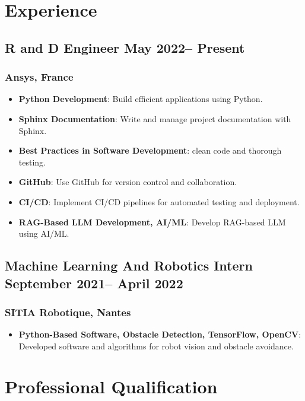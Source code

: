 \documentclass[11pt]{article}
\begin{document}
\section{Experience}
\subsection{R and D Engineer \hfill \normalfont May 2022-- Present}
\subsubsection{Ansys, France}
\begin{itemize}
    \item[\textbullet] \textbf{Python Development}: Build efficient applications using Python.
    \item[\textbullet] \textbf{Sphinx Documentation}: Write and manage project documentation with Sphinx.
    \item[\textbullet] \textbf{Best Practices in Software Development}: clean code and thorough testing.
    \item[\textbullet] \textbf{GitHub}: Use GitHub for version control and collaboration.
    \item[\textbullet] \textbf{CI/CD}: Implement CI/CD pipelines for automated testing and deployment.
    \item[\textbullet] \textbf{RAG-Based LLM Development, AI/ML}: Develop RAG-based LLM using AI/ML.
\end{itemize}

\subsection{Machine Learning And Robotics Intern \hfill \normalfont September 2021-- April 2022}
\subsubsection{SITIA Robotique, Nantes}
\begin{itemize}
    \item[\textbullet] \textbf{Python-Based Software, Obstacle Detection, TensorFlow, OpenCV}: Developed software and algorithms for robot vision and obstacle avoidance.
\end{itemize}

\section{Professional Qualification}
\end{document}
